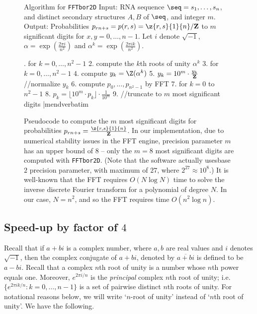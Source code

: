 \begin{figure}[!h]
\begin{small}
{\sc Algorithm} for {\tt FFTbor2D}\hfill\break
{\sc Input:} RNA sequence $\seq=s_1,\ldots,s_n$, and distinct secondary
structures $A,B$ of $\seq$, and integer $m$. \hfill\break
{\sc Output:} Probabilities $p_{rn+s} = p(r,s)=\z{r,s}{1}{n}/{\bf Z}$
to $m$ significant digits for $x,y=0,\ldots,n-1$.
Let $i$ denote $\sqrt{-1}$, $\alpha = \exp(\frac{2\pi i}{n^2})$ and
$\alpha^k = \exp(\frac{2\pi i k}{n^2})$.
\end{small}
\hfill\break
\smallskip
\begin{small}
.  for $k=0,\ldots,n^2-1$
 2.    compute the $k$th roots of unity $\alpha^k$
 3.  for $k=0,\ldots,n^2-1$
 4.    compute $y_k = \Z(\alpha^k)$
 5.    $y_k = 10^m \cdot \frac{y_k}{{\bf Z}}$ //normalize $y_k$
 6.  compute $p_0,\ldots,p_{n^2-1}$ by FFT
 7.  for $k=0$ to $n^2-1$
 8.    $p_k = \lfloor 10^m \cdot p_k \rfloor \cdot \frac{1}{10^m}$
 9.  //truncate to $m$ most significant digits
|mendverbatim
\end{small}
\caption{\small
Pseudocode to compute the $m$ most significant digits
for probabilities
$p_{rn+s} = \frac{\z{r,s}{1}{n}}{{\bf Z}}$. In our implementation,
due to numerical stability issues in the FFT engine, precision parameter
$m$ has an upper bound of $8$ -- only the $m=8$ most significant digits
are computed with {\tt FFTbor2D}.
(Note that the software actually usesbase $2$ precision parameter, with maximum of $27$, where $2^{27} \approx
10^8$.)
It is well-known that
the FFT requires $O(N \log N)$ time to solve the inverse discrete
Fourier transform for a polynomial of degree $N$. In our case,
$N=n^2$, and so the FFT requires time $O(n^2 \log n)$.
}
\label{fig:fftbor}
\end{figure}


\subsection{Speed-up by factor of $4$}
Recall that if $a+bi$ is a complex number, where $a,b$ are real values and $i$
denotes $\sqrt{-1}$, then the complex conjugate of $a+bi$, denoted by
$\overline{a+bi}$ is defined to be $a-bi$.  Recall that a complex $n$th
root of unity is a number whose $n$th power equals one. Moreover,
$e^{2 \pi i/n}$ is the {\em principal} complex $n$th root of unity; i.e.
$\{ e^{2 \pi i k/n} : k=0,\ldots,n-1 \}$ is a set of pairwise distinct
$n$th roots of unity. For notational reasons below, we will write
`$n$-root of unity' instead of `$n$th root of unity'.
We have the following.
\medskip

